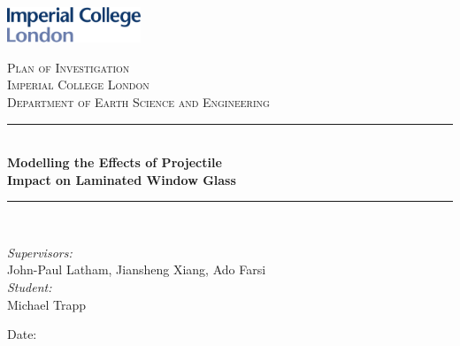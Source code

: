 \documentclass[12pt,twoside]{article}
\newcommand{\reporttitle}{Modelling the Effects of Projectile\\[0.5cm] Impact on Laminated Window Glass}
\newcommand{\reportauthor}{Michael Trapp}
\newcommand{\reportsupervisors}{John-Paul Latham, Jiansheng Xiang, Ado Farsi}
\newcommand{\reporttype}{\Huge Plan of Investigation}
\theoremstyle{break}
\begin{document}
\begin{titlepage}

\newcommand{\HRule}{\rule{\linewidth}{0.5mm}} %


\includegraphics[width = 4cm]{imperial} 

\begin{center} %

\vspace{1.5cm} 
\textsc{\LARGE \reporttype}\\[1.5cm] 
\textsc{\Large Imperial College London}\\[0.5cm] 
\textsc{\large Department of Earth Science and Engineering}\\[0.5cm] 

\HRule \\[0.2cm]
{\huge \bfseries \reporttitle}\\ %
\HRule \\[1.5cm]
\end{center}

\begin{flushleft} \large
\textit{Supervisors:}\\
\reportsupervisors\\[30pt]
\textit{Student:}\\
\reportauthor %
\end{flushleft}
\vspace{2cm}
\makeatletter
Date: \@date 

\vfill %

\end{titlepage}
\end{document}
